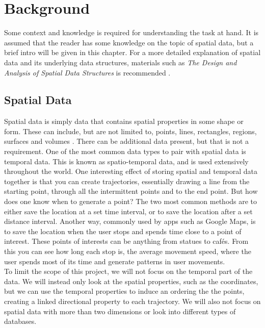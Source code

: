 \chapter{Background}
Some context and knowledge is required for understanding the task at hand. It is assumed that the reader has some knowledge on the topic of spatial data, but a brief intro will be given in this chapter. For a more detailed explanation of spatial data and its underlying data structures, materials such as \textit{The Design and Analysis of Spatial Data Structures} is recommended \cite{spatial_data_structures}.
\section{Spatial Data}
Spatial data is simply data that contains spatial properties in some shape or form. These can include, but are not limited to, points, lines, rectangles, regions, surfaces and volumes \cite{spatial_data_structures}. There can be additional data present, but that is not a requirement. One of the most common data types to pair with spatial data is temporal data. This is known as spatio-temporal data, and is used extensively throughout the world. One interesting effect of storing spatial and temporal data together is that you can create trajectories, essentially drawing a line from the starting point, through all the intermittent points and to the end point. But how does one know when to generate a point? The two most common methods are to either save the location at a set time interval, or to save the location after a set distance interval. Another way, commonly used by apps such as Google Maps, is to save the location when the user stops and spends time close to a point of interest. These points of interests can be anything from statues to cafés. From this you can see how long each stop is, the average movement speed, where the user spends most of its time and generate patterns in user movements. \\

To limit the scope of this project, we will not focus on the temporal part of the data. We will instead only look at the spatial properties, such as the coordinates, but we can use the temporal properties to induce an ordering the the points, creating a linked directional property to each trajectory. We will also not focus on spatial data with more than two dimensions or look into different types of databases.

